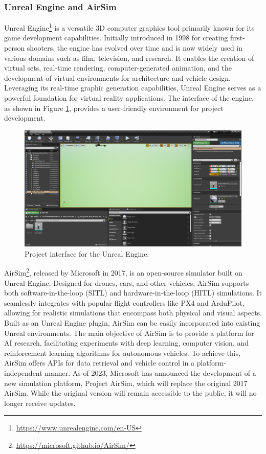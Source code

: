 \subsubsection{Unreal Engine and AirSim}
\label{subsec:unreal}

Unreal Engine\footnote{\url{https://www.unrealengine.com/en-US}} is a versatile 3D computer graphics tool primarily known for its game development capabilities. Initially introduced in 1998 for creating first-person shooters, the engine has evolved over time and is now widely used in various domains such as film, television, and research. It enables the creation of virtual sets, real-time rendering, computer-generated animation, and the development of virtual environments for architecture and vehicle design. Leveraging its real-time graphic generation capabilities, Unreal Engine serves as a powerful foundation for virtual reality applications. The interface of the engine, as shown in Figure \ref{fig:ue-interface}, provides a user-friendly environment for project development.

\begin{figure}
  \centering
  \includegraphics[width=\textwidth,keepaspectratio]{img/ue-interface.png}
  \caption{Project interface for the Unreal Engine.}\label{fig:ue-interface}
\end{figure}


AirSim\footnote{\url{https://microsoft.github.io/AirSim/}}, released by Microsoft in 2017, is an open-source simulator built on Unreal Engine. Designed for drones, cars, and other vehicles, AirSim supports both software-in-the-loop (SITL) and hardware-in-the-loop (HITL) simulations. It seamlessly integrates with popular flight controllers like PX4 and ArduPilot, allowing for realistic simulations that encompass both physical and visual aspects. Built as an Unreal Engine plugin, AirSim can be easily incorporated into existing Unreal environments. The main objective of AirSim is to provide a platform for AI research, facilitating experiments with deep learning, computer vision, and reinforcement learning algorithms for autonomous vehicles. To achieve this, AirSim offers APIs for data retrieval and vehicle control in a platform-independent manner. As of 2023, Microsoft has announced the development of a new simulation platform, Project AirSim, which will replace the original 2017 AirSim. While the original version will remain accessible to the public, it will no longer receive updates.

